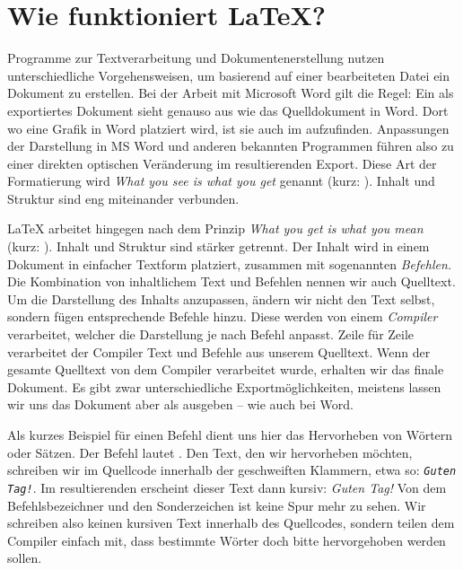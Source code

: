 \chapter{Wie funktioniert \LaTeX?}
\label{sec:basic-functionality}

Programme zur Textverarbeitung und Dokumentenerstellung nutzen unterschiedliche Vorgehensweisen, um basierend auf einer bearbeiteten Datei ein Dokument zu erstellen.
Bei der Arbeit mit Microsoft Word gilt die Regel: Ein als  exportiertes Dokument sieht genauso aus wie das Quelldokument in Word. Dort wo eine Grafik in Word platziert wird, ist sie auch im  aufzufinden. Anpassungen der Darstellung in MS Word und anderen bekannten Programmen führen also zu einer direkten optischen Veränderung im resultierenden Export. Diese Art der Formatierung wird \emph{What you see is what you get} genannt (kurz: ). Inhalt und Struktur sind eng miteinander verbunden.

\LaTeX{} arbeitet hingegen nach dem Prinzip \emph{What you get is what you mean} (kurz: ). Inhalt und Struktur sind stärker getrennt.
Der Inhalt wird in einem Dokument in einfacher Textform platziert, zusammen mit sogenannten \emph{Befehlen}\textit{.} Die Kombination von inhaltlichem Text und Befehlen nennen wir auch Quelltext. Um die Darstellung des Inhalts anzupassen, ändern wir nicht den Text selbst, sondern fügen entsprechende Befehle hinzu. Diese werden von einem \emph{Compiler} verarbeitet, welcher die Darstellung je nach Befehl anpasst. Zeile für Zeile verarbeitet der Compiler Text und Befehle aus unserem Quelltext. Wenn der gesamte Quelltext von dem Compiler verarbeitet wurde, erhalten wir das finale Dokument. Es gibt zwar unterschiedliche Exportmöglichkeiten, meistens lassen wir uns das Dokument aber als  ausgeben -- wie auch bei Word.

Als kurzes Beispiel für einen Befehl dient uns hier das Hervorheben von Wörtern oder Sätzen. Der Befehl lautet \texttt{\emph{}}. Den Text, den wir hervorheben möchten, schreiben wir im Quellcode innerhalb der geschweiften Klammern, etwa so: \texttt{\emph{Guten Tag!}}. Im resultierenden  erscheint dieser Text dann kursiv: \emph{Guten Tag!} Von dem Befehlsbezeichner und den Sonderzeichen ist keine Spur mehr zu sehen. Wir schreiben also keinen kursiven Text innerhalb des Quellcodes, sondern teilen dem Compiler einfach mit, dass bestimmte Wörter doch bitte hervorgehoben werden sollen.


